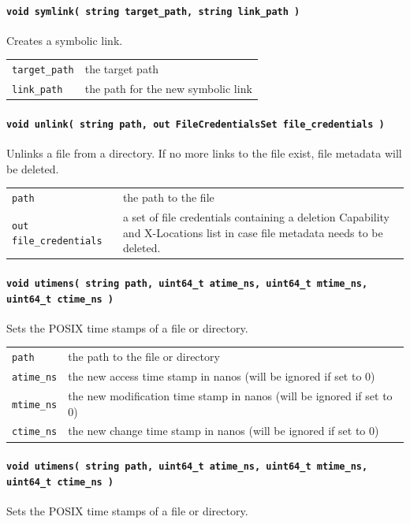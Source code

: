 \paragraph{\texttt{void symlink( string target\_path, string link\_path~)}}
Creates a symbolic link.

\begin{tabularx}{\textwidth}{lX}
 \texttt{target\_path} & the target path\\
 \texttt{link\_path} & the path for the new symbolic link\\
\end{tabularx}

\paragraph{\texttt{void unlink( string path, out FileCredentialsSet file\_credentials~)}}
Unlinks a file from a directory. If no more links to the file exist, file metadata will be deleted.

\begin{tabularx}{\textwidth}{lX}
 \texttt{path} & the path to the file\\
 \texttt{out file\_credentials} & a set of file credentials containing a deletion Capability and X-Locations list in case file metadata needs to be deleted.\\
\end{tabularx}

\paragraph{\texttt{void utimens( string path, uint64\_t atime\_ns, uint64\_t mtime\_ns, uint64\_t ctime\_ns )}}
Sets the POSIX time stamps of a file or directory.

\begin{tabularx}{\textwidth}{lX}
 \texttt{path} & the path to the file or directory\\
 \texttt{atime\_ns} & the new access time stamp in nanos (will be ignored if set to 0)\\
 \texttt{mtime\_ns} & the new modification time stamp in nanos (will be ignored if set to 0)\\
 \texttt{ctime\_ns} & the new change time stamp in nanos (will be ignored if set to 0)\\
\end{tabularx}

\paragraph{\texttt{void utimens( string path, uint64\_t atime\_ns, uint64\_t mtime\_ns, uint64\_t ctime\_ns )}}
Sets the POSIX time stamps of a file or directory.

